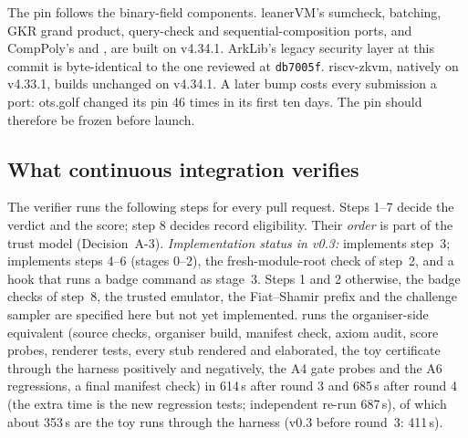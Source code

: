 \noindent The pin follows the binary-field components. leanerVM's sumcheck, batching, GKR grand
product, query-check and sequential-composition ports, and CompPoly's  and
, are built on v4.34.1. ArkLib's legacy security layer at this commit is
byte-identical to the one reviewed at \texttt{db7005f}. riscv-zkvm, natively on v4.33.1, builds
unchanged on v4.34.1. A later bump costs every submission a port: ots.golf changed its pin 46
times in its first ten days. The pin should therefore be frozen before launch.

\subsection{What continuous integration verifies}\label{subsec:arch-ci}

The verifier runs the following steps for every pull request. Steps 1--7 decide the verdict and the
score; step 8 decides record eligibility. Their \emph{order} is part of the trust model
(Decision~A-3). \emph{Implementation status in v0.3:} 
implements step~3;  implements steps 4--6 (stages 0--2), the
fresh-module-root check of step~2, and a hook that runs a badge command as stage~3. Steps 1 and 2
otherwise, the badge checks of step~8, the trusted emulator, the Fiat--Shamir prefix and the
challenge sampler are specified here but not yet implemented.  runs the
organiser-side equivalent (source checks, organiser build, manifest
check, axiom audit, score probes, renderer tests, every stub rendered and elaborated, the toy
certificate through the harness positively and negatively, the A4 gate probes and the A6
regressions, a final manifest check) in 614\,s after round 3 and 685\,s after round 4 (the extra time is the new
regression tests; independent re-run 687\,s), of which about 353\,s are the toy runs through the harness
(v0.3 before round~3: 411\,s).
